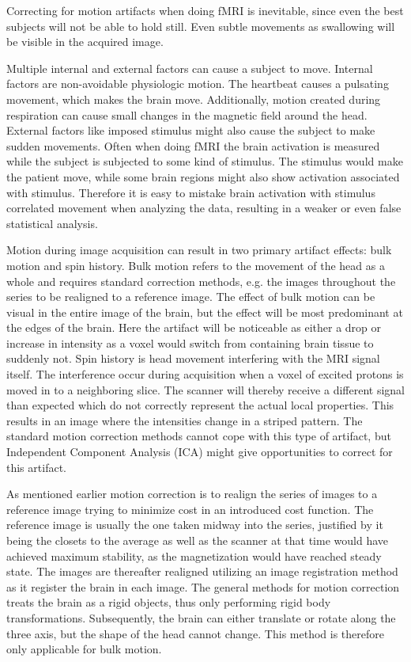 Correcting for motion artifacts when doing fMRI is inevitable, since even the best subjects will not be able to hold still. Even subtle movements as swallowing will be visible in the acquired image. \cite{Poldrack2011} 

Multiple internal and external factors can cause a subject to move. Internal factors are non-avoidable physiologic motion. The heartbeat causes a pulsating movement, which makes the brain move. Additionally, motion created during respiration can cause small changes in the magnetic field around the head. External factors like imposed stimulus might also cause the subject to make sudden movements. Often when doing fMRI the brain activation is measured while the subject is subjected to some kind of stimulus. The stimulus would make the patient move, while some brain regions might also show activation associated with stimulus. Therefore it is easy to mistake brain activation with stimulus correlated movement when analyzing the data, resulting in a weaker or even false statistical analysis. \cite{Poldrack2011} 

Motion during image acquisition can result in two primary artifact effects: bulk motion and spin history. Bulk motion refers to the movement of the head as a whole and requires standard correction methods, e.g. the images throughout the series to be realigned to a reference image. The effect of bulk motion can be visual in the entire image of the brain, but the effect will be most predominant at the edges of the brain. Here the artifact will be noticeable as either a drop or increase in intensity as a voxel would switch from containing brain tissue to suddenly not.  
Spin history is head movement interfering with the MRI signal itself. The interference occur during acquisition when a voxel of excited protons is moved in to a neighboring slice. The scanner will thereby receive a different signal than expected which do not correctly represent the actual local properties. This results in an image where the intensities change in a striped pattern. The standard motion correction methods cannot cope with this type of artifact, but Independent Component Analysis (ICA) might give opportunities to correct for this artifact. \cite{Poldrack2011} 

As mentioned earlier motion correction is to realign the series of images to a reference image trying to minimize cost in an introduced cost function. The reference image is usually the one taken midway into the series, justified by it being the closets to the average as well as the scanner at that time would have achieved maximum stability, as the magnetization would have reached steady state. The images are thereafter realigned utilizing an image registration method as it register the brain in each image. The general methods for motion correction treats the brain as a rigid objects, thus only performing rigid body transformations. Subsequently, the brain can either translate or rotate along the three axis, but the shape of the head cannot change. This method is therefore only applicable for bulk motion. \cite{Poldrack2011} 

